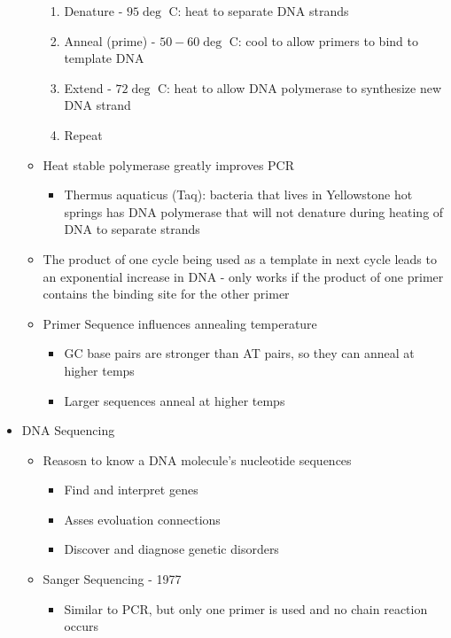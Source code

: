 \documentclass[12pt]{article}
\begin{document}
\begin{itemize}
\begin{itemize}
\begin{enumerate}
                \item Denature - $95\deg$ C: heat to separate DNA strands
                \item Anneal (prime) - $50-60\deg$ C: cool to allow primers to bind to template DNA
                \item Extend - $72\deg$ C: heat to allow DNA polymerase to synthesize new DNA strand
                \item Repeat
            \end{enumerate}
            \item Heat stable polymerase greatly improves PCR
            \begin{itemize}
                \item Thermus aquaticus (Taq): bacteria that lives in Yellowstone hot springs has DNA polymerase that will not denature during heating of DNA to separate strands
            \end{itemize}
            \item The product of one cycle being used as a template in next cycle leads to an exponential increase in DNA - only works if the product of one primer contains the binding site for the other primer
            \item Primer Sequence influences annealing temperature
            \begin{itemize}
                \item GC base pairs are stronger than AT pairs, so they can anneal at higher temps
                \item Larger sequences anneal at higher temps
            \end{itemize}
        \end{itemize}
        \item DNA Sequencing
        \begin{itemize}
            \item Reasosn to know a DNA molecule's nucleotide sequences
            \begin{itemize}
                \item Find and interpret genes
                \item Asses evoluation connections
                \item Discover and diagnose genetic disorders
            \end{itemize}
            \item Sanger Sequencing - 1977
            \begin{itemize}
                \item Similar to PCR, but only one primer is used and no chain reaction occurs

\end{itemize}
\end{itemize}
\end{itemize}
\end{document}
